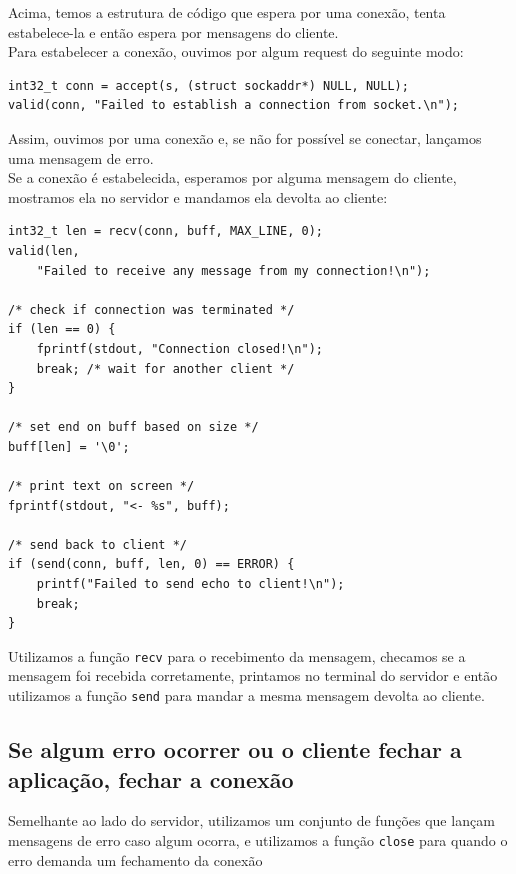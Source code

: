 \documentclass[10pt,twocolumn,letterpaper]{article}
\begin{document}
	Acima, temos a estrutura de código que espera por uma conexão, tenta estabelece-la e então espera por mensagens do cliente. \\

	Para estabelecer a conexão, ouvimos por algum request do seguinte modo:

	\begin{lstlisting}[caption={Estabelecimento de conexão}, label=Algorithm]
int32_t conn = accept(s, (struct sockaddr*) NULL, NULL);
valid(conn, "Failed to establish a connection from socket.\n");
	\end{lstlisting}

	Assim, ouvimos por uma conexão e, se não for possível se conectar, lançamos uma mensagem de erro. \\

	Se a conexão é estabelecida, esperamos por alguma mensagem do cliente, mostramos ela no servidor e mandamos ela devolta ao cliente:

	\begin{lstlisting}[caption={Estabelecimento de conexão}, label=Algorithm]
int32_t len = recv(conn, buff, MAX_LINE, 0);
valid(len, 
    "Failed to receive any message from my connection!\n");

/* check if connection was terminated */
if (len == 0) {
    fprintf(stdout, "Connection closed!\n");
    break; /* wait for another client */
}

/* set end on buff based on size */
buff[len] = '\0';

/* print text on screen */
fprintf(stdout, "<- %s", buff);

/* send back to client */
if (send(conn, buff, len, 0) == ERROR) {
    printf("Failed to send echo to client!\n");
    break;
}
	\end{lstlisting}

	Utilizamos a função \texttt{recv} para o recebimento da mensagem, checamos se a mensagem foi recebida corretamente, printamos no terminal do servidor e então utilizamos a função \texttt{send} para mandar a mesma mensagem devolta ao cliente.\\

\subsection{Se algum erro ocorrer ou o cliente fechar a aplicação, fechar a conexão}

Semelhante ao lado do servidor, utilizamos um conjunto de funções que lançam mensagens de erro caso algum ocorra, e utilizamos a função \texttt{close} para quando o erro demanda um fechamento da conexão
\end{document}
